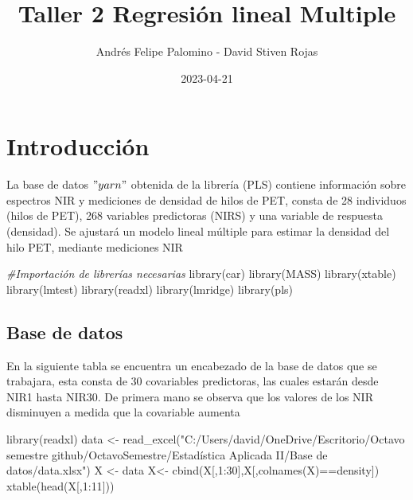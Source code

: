\documentclass[
]{article}
\title{Taller 2 Regresión lineal Multiple}
\author{Andrés Felipe Palomino - David Stiven Rojas}
\date{2023-04-21}
\newenvironment{Shaded}{\begin{snugshade}}{\end{snugshade}}
\newcommand{\CommentTok}[1]{\textcolor[rgb]{0.56,0.35,0.01}{\textit{#1}}}
\newcommand{\DecValTok}[1]{\textcolor[rgb]{0.00,0.00,0.81}{#1}}
\newcommand{\FunctionTok}[1]{\textcolor[rgb]{0.00,0.00,0.00}{#1}}
\newcommand{\NormalTok}[1]{#1}
\newcommand{\OtherTok}[1]{\textcolor[rgb]{0.56,0.35,0.01}{#1}}
\newcommand{\SpecialCharTok}[1]{\textcolor[rgb]{0.00,0.00,0.00}{#1}}
\newcommand{\StringTok}[1]{\textcolor[rgb]{0.31,0.60,0.02}{#1}}
\begin{document}
\maketitle

\hypertarget{introducciuxf3n}{%
\section{Introducción}\label{introducciuxf3n}}

La base de datos \("yarn"\) obtenida de la librería (PLS) contiene
información sobre espectros NIR y mediciones de densidad de hilos de
PET, consta de 28 individuos (hilos de PET), 268 variables predictoras
(NIRS) y una variable de respuesta (densidad). Se ajustará un modelo
lineal múltiple para estimar la densidad del hilo PET, mediante
mediciones NIR

\begin{Shaded}
\begin{Highlighting}[]
\CommentTok{\#Importación de librerías necesarias}
\FunctionTok{library}\NormalTok{(car)}
\FunctionTok{library}\NormalTok{(MASS)}
\FunctionTok{library}\NormalTok{(xtable)}
\FunctionTok{library}\NormalTok{(lmtest)}
\FunctionTok{library}\NormalTok{(readxl)}
\FunctionTok{library}\NormalTok{(lmridge)}
\FunctionTok{library}\NormalTok{(pls)}
\end{Highlighting}
\end{Shaded}

\hypertarget{base-de-datos}{%
\subsection{Base de datos}\label{base-de-datos}}

En la siguiente tabla se encuentra un encabezado de la base de datos que
se trabajara, esta consta de 30 covariables predictoras, las cuales
estarán desde NIR1 hasta NIR30. De primera mano se observa que los
valores de los NIR disminuyen a medida que la covariable aumenta

\begin{Shaded}
\begin{Highlighting}[]
\FunctionTok{library}\NormalTok{(readxl)}
\NormalTok{data }\OtherTok{\textless{}{-}} \FunctionTok{read\_excel}\NormalTok{(}\StringTok{"C:/Users/david/OneDrive/Escritorio/Octavo semestre github/OctavoSemestre/Estadística Aplicada II/Base de datos/data.xlsx"}\NormalTok{)}
\NormalTok{X }\OtherTok{\textless{}{-}}\NormalTok{ data}
\NormalTok{X}\OtherTok{\textless{}{-}} \FunctionTok{cbind}\NormalTok{(X[,}\DecValTok{1}\SpecialCharTok{:}\DecValTok{30}\NormalTok{],X[,}\FunctionTok{colnames}\NormalTok{(X)}\SpecialCharTok{==}\StringTok{\textquotesingle{}density\textquotesingle{}}\NormalTok{])}
\FunctionTok{xtable}\NormalTok{(}\FunctionTok{head}\NormalTok{(X[,}\DecValTok{1}\SpecialCharTok{:}\DecValTok{11}\NormalTok{]))}
\end{Highlighting}
\end{Shaded}
\end{document}
